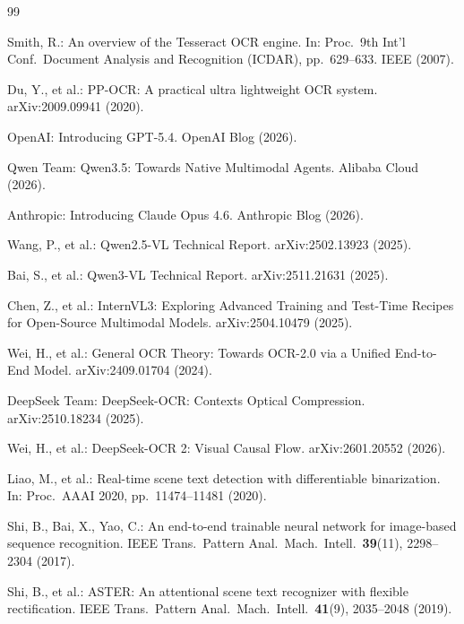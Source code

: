 \documentclass[12pt, a4paper]{article}
\begin{document}
\begin{thebibliography}{99}

Smith, R.:
An overview of the Tesseract OCR engine.
In: Proc.\ 9th Int'l Conf.\ Document Analysis and Recognition (ICDAR),
pp.\ 629--633. IEEE (2007).

Du, Y., et al.:
PP-OCR: A practical ultra lightweight OCR system.
arXiv:2009.09941 (2020).

OpenAI:
Introducing GPT-5.4.
OpenAI Blog (2026).

Qwen Team:
Qwen3.5: Towards Native Multimodal Agents.
Alibaba Cloud (2026).

Anthropic:
Introducing Claude Opus 4.6.
Anthropic Blog (2026).

Wang, P., et al.:
Qwen2.5-VL Technical Report.
arXiv:2502.13923 (2025).

Bai, S., et al.:
Qwen3-VL Technical Report.
arXiv:2511.21631 (2025).

Chen, Z., et al.:
InternVL3: Exploring Advanced Training and Test-Time Recipes
for Open-Source Multimodal Models.
arXiv:2504.10479 (2025).

Wei, H., et al.:
General OCR Theory: Towards OCR-2.0 via a Unified End-to-End Model.
arXiv:2409.01704 (2024).

DeepSeek Team:
DeepSeek-OCR: Contexts Optical Compression.
arXiv:2510.18234 (2025).

Wei, H., et al.:
DeepSeek-OCR 2: Visual Causal Flow.
arXiv:2601.20552 (2026).

Liao, M., et al.:
Real-time scene text detection with differentiable binarization.
In: Proc.\ AAAI 2020, pp.\ 11474--11481 (2020).

Shi, B., Bai, X., Yao, C.:
An end-to-end trainable neural network for image-based sequence recognition.
IEEE Trans.\ Pattern Anal.\ Mach.\ Intell.\ \textbf{39}(11), 2298--2304 (2017).

Shi, B., et al.:
ASTER: An attentional scene text recognizer with flexible rectification.
IEEE Trans.\ Pattern Anal.\ Mach.\ Intell.\ \textbf{41}(9), 2035--2048 (2019).


\end{thebibliography}
\end{document}
